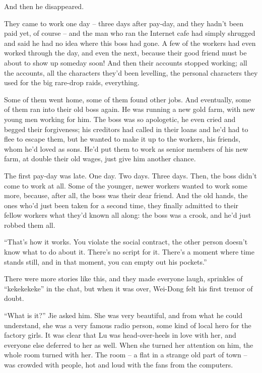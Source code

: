 And then he disappeared.

They came to work one day -- three days after pay-day, and they
hadn't been paid yet, of course -- and the man who ran the Internet
cafe had simply shrugged and said he had no idea where this boss
had gone. A few of the workers had even worked through the day, and
even the next, because their good friend must be about to show up
someday soon! And then their accounts stopped working; all the
accounts, all the characters they'd been levelling, the personal
characters they used for the big rare-drop raids, everything.

Some of them went home, some of them found other jobs. And
eventually, some of them ran into their old boss again. He was
running a new gold farm, with new young men working for him. The
boss was so apologetic, he even cried and begged their forgiveness;
his creditors had called in their loans and he'd had to flee to
escape them, but he wanted to make it up to the workers, his
friends, whom he'd loved as sons. He'd put them to work as senior
members of his new farm, at double their old wages, just give him
another chance.

The first pay-day was late. One day. Two days. Three days. Then,
the boss didn't come to work at all. Some of the younger, newer
workers wanted to work some more, because, after all, the boss was
their dear friend. And the old hands, the ones who'd just been
taken for a second time, they finally admitted to their fellow
workers what they'd known all along: the boss was a crook, and he'd
just robbed them all.

``That's how it works. You violate the social contract, the other
person doesn't know what to do about it. There's no script for it.
There's a moment where time stands still, and in that moment, you
can empty out his pockets.''

There were more stories like this, and they made everyone laugh,
sprinkles of ``kekekekeke'' in the chat, but when it was over,
Wei-Dong felt his first tremor of doubt.

``What is it?'' Jie asked him. She was very beautiful, and from what
he could understand, she was a very famous radio person, some kind
of local hero for the factory girls. It was clear that Lu was
head-over-heels in love with her, and everyone else deferred to her
as well. When she turned her attention on him, the whole room
turned with her. The room -- a flat in a strange old part of town
-- was crowded with people, hot and loud with the fans from the
computers.

